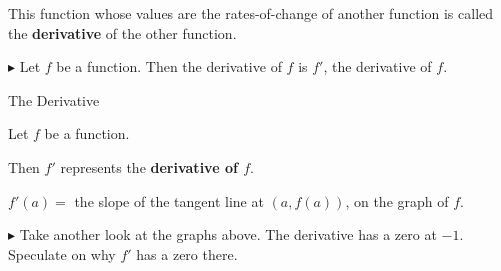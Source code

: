\documentclass{ximera}
\begin{document}
This function whose values are the rates-of-change of another function is called the \textbf{derivative} of the other function.




$\blacktriangleright$ Let $f$ be a function.  Then the derivative of $f$ is $f'$, the derivative of $f$.



\begin{definition} The Derivative

Let $f$ be a function.

Then $f'$ represents the \textbf{derivative of $f$}.


$f'(a) = $ the slope of the tangent line at $(a, f(a))$, on the graph of $f$.




\end{definition}





$\blacktriangleright$ Take another look at the graphs above.  The derivative has a zero at $-1$.  Speculate on why $f'$ has a  zero there.
\end{document}
